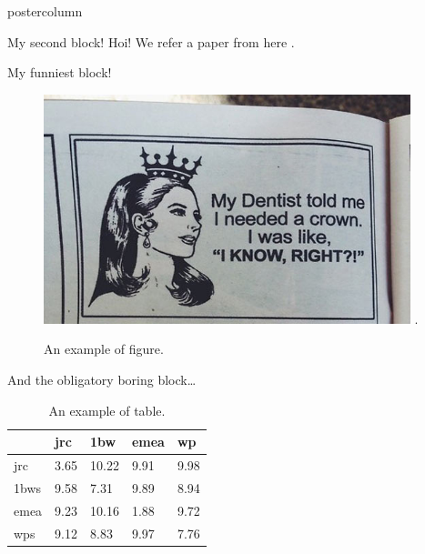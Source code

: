 \documentclass[roundedcorners=true, titleposition=left]{beamerSEG2021poster}
\begin{document}
\begin{frame}
\begin{columns}
\begin{column}{0.19\textwidth}
\begin{beamercolorbox}[center, wd=\textwidth]{postercolumn}
\begin{minipage}[T]{0.95\textwidth}
\parbox[t][\columnheight]{\textwidth}{%
  \begin{block}{My second block!}
  	Hoi! We refer a paper from here \cite{lamport,kopka}.
  \end{block}
  \medskip
  \begin{block}{My funniest block!}
    \begin{figure}[H]
      \centering
      \includegraphics[width=0.95\textwidth]{funnygirl}
      \DeclareGraphicsExtensions.
      \caption{An example of figure.}
    \end{figure}
  \end{block}
  \medskip
  \begin{block}{And the obligatory boring block\ldots}
    \begin{table}[H]
      \centering
      \caption{An example of table.}
    	\begin{tabular}{lllll}
        \toprule
             & jrc  & 1bw   & emea & wp   \\
        \midrule
        jrc  & 3.65 & 10.22 & 9.91 & 9.98 \\
        1bws & 9.58 & 7.31  & 9.89 & 8.94 \\
        emea & 9.23 & 10.16 & 1.88 & 9.72 \\
        wps  & 9.12 & 8.83  & 9.97 & 7.76 \\
        \bottomrule
      \end{tabular}
    \end{table}
  \end{block}
}
\end{minipage}
\end{beamercolorbox}
\end{column}


\end{columns}
\end{frame}
\end{document}

